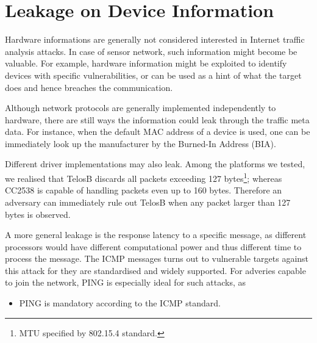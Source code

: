 \section{Leakage on Device Information}


Hardware informations are generally not considered interested in Internet traffic analysis attacks. In case of sensor network, such 
information might become be valuable. For example, hardware information might be exploited to identify devices with specific vulnerabilities, or can be used as a hint of what the target does and hence breaches the communication.

Although network protocols are generally implemented independently to hardware, there are still ways the information could leak through the traffic meta data. For instance, when the default MAC address of a device is used, one can be immediately look up the manufacturer by the Burned-In Address (BIA)\cite{BIA}.

Different driver implementations may also leak. Among the platforms we tested, we realised that TelosB\cite{TelosB} discards all packets exceeding 127 bytes\footnote{MTU specified by 802.15.4 standard.}; whereas CC2538 is capable of handling packets even up to 160 bytes. Therefore an adversary can immediately rule out TelosB when any packet larger than 127 bytes is observed.

A more general leakage is the response latency to a specific message, as different processors would have different computational power and thus different time to process the message. The ICMP messages turns out to vulnerable targets against this attack for they are standardised and widely supported. For adveries capable to join the network, PING is especially ideal for such attacks, as
\begin{itemize}
	\item PING is mandatory according to the ICMP standard.
\end{itemize}


